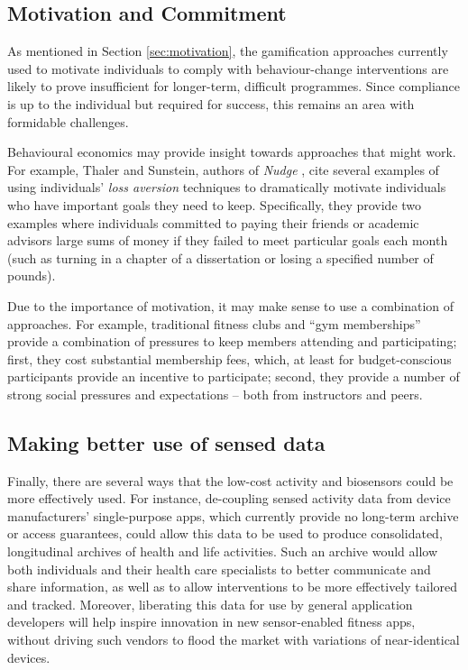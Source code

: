 \documentclass{sig-alternate}
\begin{document}

\subsection{Motivation and Commitment}

As mentioned in Section \ref{sec:motivation}, the gamification
approaches currently used to motivate individuals to comply with
behaviour-change interventions are likely to prove insufficient for
longer-term, difficult programmes. Since compliance is up to the
individual but required for success, this remains an area with
formidable challenges.

Behavioural economics may provide insight towards approaches that
might work.  For example, Thaler and Sunstein, authors of \emph{Nudge}
\cite{thaler2008nudge}, cite several examples of using individuals' \emph{loss
  aversion} techniques to dramatically motivate individuals who have
important goals they need to keep.  Specifically, they provide two
examples where individuals committed to paying their friends or
academic advisors large sums of money if they failed to meet
particular goals each month (such as turning in a chapter of a
dissertation or losing a specified number of pounds).

Due to the importance of motivation, it may make sense to use a
combination of approaches.  For example, traditional fitness clubs and
``gym memberships'' provide a combination of pressures to keep members
attending and participating; first, they cost substantial membership
fees, which, at least for budget-conscious participants provide an
incentive to participate; second, they provide a number of strong
social pressures and expectations -- both from instructors and peers.

\subsection{Making better use of sensed data}

Finally, there are several ways that the low-cost activity and
biosensors could be more effectively used.  For instance, de-coupling
sensed activity data from device manufacturers' single-purpose apps,
which currently provide no long-term archive or access guarantees,
could allow this data to be used to produce consolidated, longitudinal
archives of health and life activities.  Such an archive would allow
both individuals and their health care specialists to better
communicate and share information, as well as to allow interventions
to be more effectively tailored and tracked.  Moreover, liberating
this data for use by general application developers will help inspire
innovation in new sensor-enabled fitness apps, without driving such
vendors to flood the market with variations of near-identical devices.
\end{document}
